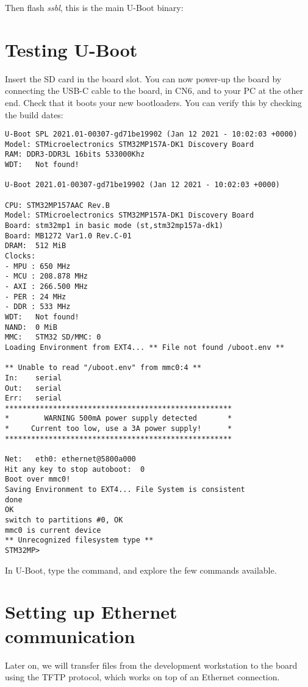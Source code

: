 Then flash {\em ssbl}, this is the main U-Boot binary:


\section{Testing U-Boot}

Insert the SD card in the board slot. You can now power-up the board
by connecting the USB-C cable to the board, in CN6,  and
to your PC at the other end. Check that it boots your new bootloaders.
You can verify this by checking the build dates:

\begin{verbatim}
U-Boot SPL 2021.01-00307-gd71be19902 (Jan 12 2021 - 10:02:03 +0000)
Model: STMicroelectronics STM32MP157A-DK1 Discovery Board
RAM: DDR3-DDR3L 16bits 533000Khz
WDT:   Not found!

U-Boot 2021.01-00307-gd71be19902 (Jan 12 2021 - 10:02:03 +0000)

CPU: STM32MP157AAC Rev.B
Model: STMicroelectronics STM32MP157A-DK1 Discovery Board
Board: stm32mp1 in basic mode (st,stm32mp157a-dk1)
Board: MB1272 Var1.0 Rev.C-01
DRAM:  512 MiB
Clocks:
- MPU : 650 MHz
- MCU : 208.878 MHz
- AXI : 266.500 MHz
- PER : 24 MHz
- DDR : 533 MHz
WDT:   Not found!
NAND:  0 MiB
MMC:   STM32 SD/MMC: 0
Loading Environment from EXT4... ** File not found /uboot.env **

** Unable to read "/uboot.env" from mmc0:4 **
In:    serial
Out:   serial
Err:   serial
****************************************************
*        WARNING 500mA power supply detected       *
*     Current too low, use a 3A power supply!      *
****************************************************

Net:   eth0: ethernet@5800a000
Hit any key to stop autoboot:  0 
Boot over mmc0!
Saving Environment to EXT4... File System is consistent
done
OK
switch to partitions #0, OK
mmc0 is current device
** Unrecognized filesystem type **
STM32MP> 
\end{verbatim}

In U-Boot, type the  command, and explore the few commands
available.

\section{Setting up Ethernet communication}

Later on, we will transfer files from the development workstation to
the board using the TFTP protocol, which works on top of an Ethernet
connection.

